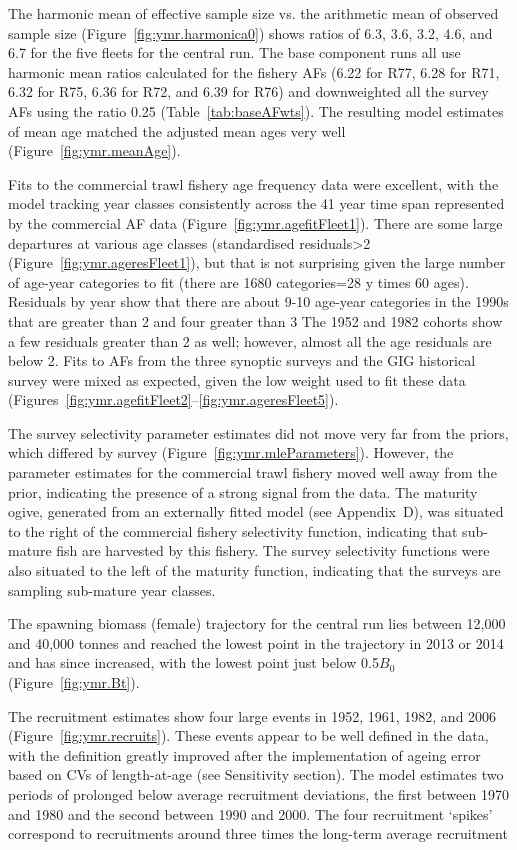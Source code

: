 \documentclass[11pt]{book}
\newcommand{\AppBio}{Appendix~D}
\begin{document}
The harmonic mean of effective sample size vs. the arithmetic mean of observed sample size (Figure~\ref{fig:ymr.harmonica0}) shows ratios of 6.3, 3.6, 3.2, 4.6, and 6.7 for the five fleets for the central run.
The base component runs all use harmonic mean ratios calculated for the fishery AFs (6.22 for R77, 6.28 for R71, 6.32 for R75, 6.36 for R72, and 6.39 for R76) and downweighted all the survey AFs using the ratio 0.25 (Table~\ref{tab:baseAFwts}).
The resulting model estimates of mean age matched the adjusted mean ages very well (Figure~\ref{fig:ymr.meanAge}).

Fits to the commercial trawl fishery age frequency data were excellent, with the model tracking year classes consistently across the 41 year time span represented by the commercial AF data (Figure~\ref{fig:ymr.agefitFleet1}).
There are some large departures at various age classes (standardised residuals>2 (Figure~\ref{fig:ymr.ageresFleet1}), but that is not surprising given the large number of age-year categories to fit (there are 1680 categories=28 y times 60 ages).
Residuals by year show that there are about 9-10 age-year categories in the 1990s that are greater than 2 and four greater than 3
The 1952 and 1982 cohorts show a few residuals greater than 2 as well; however, almost all the age residuals are below 2.
Fits to AFs from the three synoptic surveys and the GIG historical survey were mixed as expected, given the low weight used to fit these data (Figures~\ref{fig:ymr.agefitFleet2}--\ref{fig:ymr.ageresFleet5}).

The survey selectivity parameter estimates did not move very far from the priors, which differed by survey  (Figure~\ref{fig:ymr.mleParameters}).
However, the parameter estimates for the commercial trawl fishery moved well away from the prior, indicating the presence of a strong signal from the data. 
The maturity ogive, generated from an externally fitted model (see \AppBio), was situated to the right of the commercial fishery selectivity function, indicating that sub-mature fish are harvested by this fishery.
The survey selectivity functions were also situated to the left of the maturity function, indicating that the surveys are sampling sub-mature year classes.

The spawning biomass (female) trajectory for the central run lies between 12,000 and 40,000 tonnes and reached the lowest point in the trajectory in 2013 or 2014 and has since increased, with the lowest point just below 0.5$B_0$ (Figure~\ref{fig:ymr.Bt}).

The recruitment estimates show four large events in 1952, 1961, 1982, and 2006 (Figure~\ref{fig:ymr.recruits}).
These events appear to be well defined in the data, with the definition greatly improved after the implementation of ageing error based on CVs of length-at-age (see Sensitivity section).
The model estimates two periods of prolonged below average recruitment deviations, the first between 1970 and 1980 and the second between 1990 and 2000.
The four recruitment `spikes' correspond to recruitments around three times the long-term average recruitment 
\end{document}
